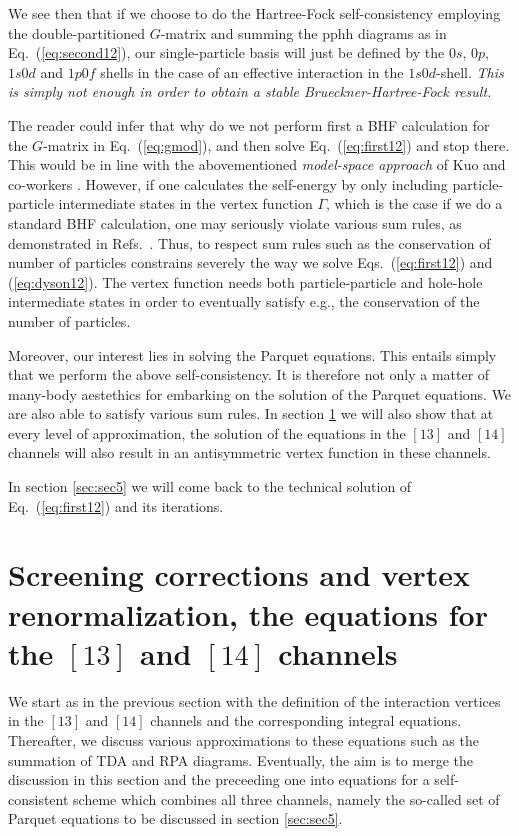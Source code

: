 We see then that if we choose to do 
the Hartree-Fock self-consistency
employing the double-partitioned $G$-matrix and summing
the pphh diagrams as in Eq.\ (\ref{eq:second12}), 
our single-particle basis will just be
defined by the $0s$, $0p$, $1s0d$ and $1p0f$ shells in the case
of an effective interaction in the $1s0d$-shell. 
{\em This is simply
not enough in order to obtain a stable Brueckner-Hartree-Fock
result.}  

The reader could infer that why do we not perform first
a BHF calculation for the $G$-matrix in Eq.\ (\ref{eq:gmod}),
and then solve Eq.\ (\ref{eq:first12}) and stop there.
This would be in line with the abovementioned 
{\em model-space approach} of Kuo and co-workers \cite{kt94}.
However, if one calculates the self-energy by only
including particle-particle intermediate states
in the vertex function $\Gamma$, which is the case
if we do a standard BHF calculation, one may seriously violate 
various sum rules, as demonstrated in Refs.\ 
\cite{ms92,mahaux85}. 
Thus, to respect sum rules such as the conservation
of number of particles constrains severely the way we
solve Eqs.\ (\ref{eq:first12}) and (\ref{eq:dyson12}).
The vertex function needs both particle-particle and hole-hole
intermediate states in order to eventually
satisfy e.g., the conservation
of the number of particles.

Moreover, our interest lies in solving
the Parquet equations. This
entails simply that we perform the above
self-consistency. 
It is therefore not only a matter of many-body aestethics for
embarking on the solution of the Parquet equations.
We are also able to satisfy various sum rules.
In section \ref{sec:sec4} we will also show that
at every level of approximation, the solution
of the equations in the $[13]$ and $[14]$ channels will
also result in an antisymmetric vertex function in these
channels. 

In section \ref{sec:sec5} we will come back to the
technical solution of Eq.\ (\ref{eq:first12}) and its
iterations. 


\section{Screening corrections and vertex renormalization, the equations
for the $[13]$ and  $[14]$ channels}
\label{sec:sec4}

We start as in the previous section with the definition of the interaction
vertices in the $[13]$ and $[14]$ channels and the corresponding
integral equations. Thereafter, we discuss various approximations
to these equations such as the summation of TDA and RPA diagrams.
Eventually, the aim is to merge the discussion in this section and 
the preceeding one into equations for a self-consistent scheme which combines 
all three channels, namely the so-called set of Parquet equations to
be discussed in section \ref{sec:sec5}. 

